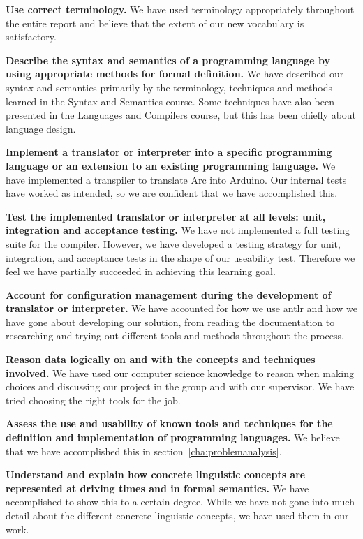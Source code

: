 \textbf{Use correct terminology.} We have used terminology appropriately throughout the entire report and believe that the extent of our new vocabulary is satisfactory.


\textbf{Describe the syntax and semantics of a programming language by using appropriate methods for formal definition.} We have described our syntax and semantics primarily by the terminology, techniques and methods learned in the Syntax and Semantics course. Some techniques have also been presented in the Languages and Compilers course, but this has been chiefly about language design.

\textbf{Implement a translator or interpreter into a specific programming language or an extension to an existing programming language.} We have implemented a transpiler to translate Arc into Arduino. Our internal tests have worked as intended, so we are confident that we have accomplished this.

\textbf{Test the implemented translator or interpreter at all levels: unit, integration and acceptance testing.} We have not implemented a full testing suite for the compiler. However, we have developed a testing strategy for unit, integration, and acceptance tests in the shape of our useability test. Therefore we feel we have partially succeeded in achieving this learning goal.

\textbf{Account for configuration management during the development of translator or interpreter.} We have accounted for how we use \gls{antlr} and how we have gone about developing our solution, from reading the documentation to researching and trying out different tools and methods throughout the process.

\textbf{Reason data logically on and with the concepts and techniques involved.} We have used our computer science knowledge to reason when making choices and discussing our project in the group and with our supervisor. We have tried choosing the right tools for the job.

\textbf{Assess the use and usability of known tools and techniques for the definition and implementation of programming languages.} We believe that we have accomplished this in section~\ref{cha:problemanalysis}.

\textbf{Understand and explain how concrete linguistic concepts are represented at driving times and in formal semantics.} We have accomplished to show this to a certain degree. While we have not gone into much detail about the different concrete linguistic concepts, we have used them in our work.